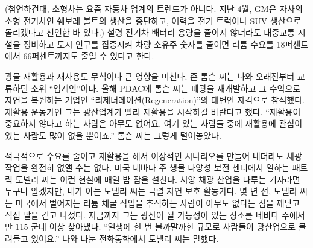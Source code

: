 \documentclass{translation}
\begin{document}
(첨언하건대, 소형차는 요즘 자동차 업계의 트렌드가 아니다.
지난 4월, GM은 자사의 소형 전기차인 쉐보레 볼트의 생산을 중단하고, 여력을 전기 트럭이나 SUV 생산으로 돌리겠다고 선언한 바 있다.)
설령 전기차 배터리 용량을 줄이지 않더라도 대중교통 시설을 정비하고 도시 인구를 집중시켜 차량 소유주 숫자를 줄이면 리튬 수요를 18퍼센트에서 66퍼센트까지도 줄일 수 있다고 한다.
% 

광물 재활용과 재사용도 무척이나 큰 영향을 미친다.
존 톰슨 씨는 나와 오래전부터 교류하던 소위 ``업계인''이다.
올해 PDAC에 톰슨 씨는 폐광을 재개발하고 그 수익으로 자연을 복원하는 기업인 ``리제너레이션(Regeneration)''의 대변인 자격으로 참석했다.
재활용 운동가인 그는 광산업계가 빨리 재활용을 시작하길 바란다고 했다.
``재활용이 중요하지 않다고 하는 사람은 아무도 없어요. 여기 있는 사람들 중에 재활용에 관심이 있는 사람도 많이 없을 뿐이죠.''
톰슨 씨는 그렇게 털어놓았다.
% 

적극적으로 수요를 줄이고 재활용을 해서 이상적인 시나리오를 만들어 내더라도 채광 작업을 완전히 없앨 수는 없다.
미국 네바다 주 생물 다양성 보전 센터에서 일하는 패트릭 도넬리 씨는 이런 현실에 매일 밤 잠을 설친다.
서양 채광 산업을 다루는 기자라면 누구나 알겠지만, 내가 아는 도넬리 씨는 극렬 자연 보호 활동가다.
몇 년 전, 도넬리 씨는 미국에서 벌어지는 리튬 채굴 작업을 추적하는 사람이 아무도 없다는 점을 깨닫고 직접 팔을 걷고 나섰다.
지금까지 그는 광산이 될 가능성이 있는 장소를 네바다 주에서만 115 군데 이상 찾아냈다.
``일생에 한 번 볼까말까한 규모로 사람들이 광산업으로 몰려들고 있어요.''
나와 나눈 전화통화에서 도넬리 씨는 말했다.
% 
\end{document}
